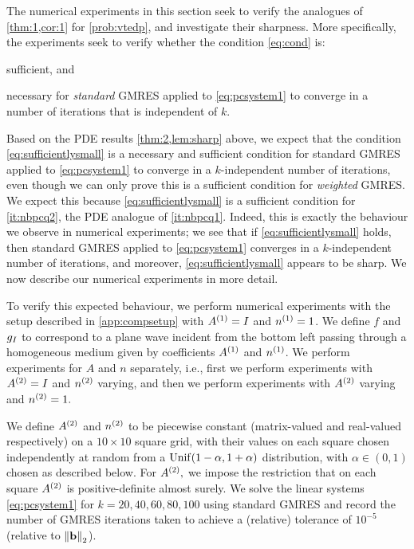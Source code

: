 The numerical experiments in this section seek to verify the analogues of \cref{thm:1,cor:1} for \cref{prob:vtedp}, and investigate their sharpness. More specifically, the experiments seek to verify whether the condition \cref{eq:cond} is:
\ben
\item sufficient, and
\item necessary
  \een
  for \emph{standard} GMRES applied to \cref{eq:pcsystem1} to converge in a number of iterations that is independent of $k.$

Based on the PDE results \cref{thm:2,lem:sharp} above, we expect that the condition \cref{eq:sufficientlysmall} is a necessary and sufficient condition for standard GMRES applied to \cref{eq:pcsystem1} to converge in a $k$-independent number of iterations, even though we can only prove this is a sufficient condition for \emph{weighted} GMRES. We expect this because \cref{eq:sufficientlysmall} is a sufficient condition for \cref{it:nbpcq2}, the PDE analogue of \cref{it:nbpcq1}. Indeed, this is exactly the behaviour we observe in numerical experiments; we see that if \cref{eq:sufficientlysmall} holds, then standard GMRES applied to \cref{eq:pcsystem1} converges in a $k$-independent number of iterations, and moreover, \cref{eq:sufficientlysmall} appears to be sharp. We now describe our numerical experiments in more detail.

To verify this expected behaviour, we perform numerical experiments with the setup described in \cref{app:compsetup} with ${A}^{(1)} = I$ and ${n}^{(1)} = 1$. We define $f$ and $g_{I}$ to correspond to a plane wave incident from the bottom left passing through a homogeneous medium given by coefficients ${A}^{(1)}$ and ${n}^{(1)}$. We perform experiments for $A$ and $n$ separately, i.e., first we perform experiments with ${A}^{(2)}=I$ and ${n}^{(2)}$ varying, and then we perform experiments with ${A}^{(2)}$ varying and ${n}^{(2)}=1.$

We define ${A}^{(2)}$ and ${n}^{(2)}$ to be piecewise constant (matrix-valued and real-valued respectively) on a $10\times10$ square grid, with their values on each square chosen independently at random from a $\Unif\mleft(1-\alpha,1+\alpha\mright)$ distribution, with $\alpha \in (0,1)$ chosen as described below. For ${A}^{(2)},$ we impose the restriction that on each square ${A}^{(2)}$ is positive-definite almost surely. We solve the linear systems \cref{eq:pcsystem1} for $k = 20,40,60,80,100$ using standard GMRES and record the number of GMRES iterations taken to achieve a (relative) tolerance of $10^{-5}$ (relative to $\Nt{\bfb}$).


